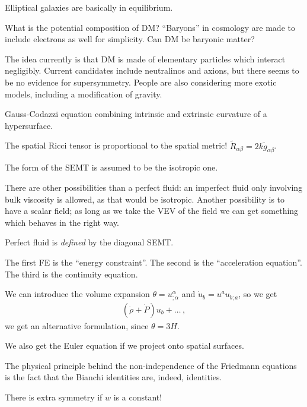 \documentclass[main.tex]{subfiles}
\begin{document}

Elliptical galaxies are basically in equilibrium.

What is the potential composition of DM?
``Baryons'' in cosmology are made to include electrons as well for simplicity. 
Can DM be baryonic matter? 

The idea currently is that DM is made of elementary particles which interact negligibly.
Current candidates include neutralinos and axions, but there seems to be no evidence
for supersymmetry. 
People are also considering more exotic models, including a modification of gravity.

Gauss-Codazzi equation combining intrinsic and extrinsic curvature of a hypersurface. 

The spatial Ricci tensor is proportional to the spatial metric! 
\(\widetilde{R}_{\alpha \beta} = 2k \widetilde{g} _{\alpha \beta }\).  

The form of the SEMT is assumed to be the isotropic one. 

There are other possibilities than a perfect fluid: 
an imperfect fluid only involving bulk viscosity is allowed, as that would 
be isotropic.
Another possibility is to have a scalar field; 
as long as we take the VEV of the field we can get something 
which behaves in the right way. 

Perfect fluid is \emph{defined} by the diagonal SEMT. 


The first FE is the ``energy constraint''. 
The second is the ``acceleration equation''. 
The third is the continuity equation. 

We can introduce the volume expansion \(\theta = u^\alpha_{; \alpha }\)
and \(\dot{u}_b = u^a u_{b; a}\), so we get 
%
\begin{align}
( \dot{\rho} + \dot{P}) u_b + \dots
\,,
\end{align}
%
we get an alternative formulation, since \(\theta = 3H\). 

We also get the Euler equation if we project onto spatial surfaces. 

The physical principle behind the non-independence of the Friedmann equations 
is the fact that the Bianchi identities are, indeed, identities. 

There is extra symmetry if \(w\) is a constant! 
\end{document}
